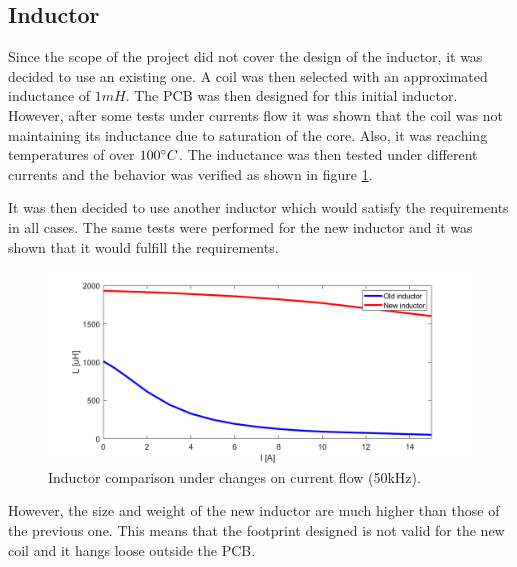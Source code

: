 \subsection{Inductor}
\label{Coil problems}
Since the scope of the project did not cover the design of the inductor, it was decided to use an existing one. A coil was then selected with an approximated inductance of $1mH$.
The PCB was then designed for this initial inductor. However, after some  tests under currents flow it was shown that the coil was not maintaining its inductance due to saturation of the core. Also, it was reaching temperatures of over $100\dec C$. The inductance was then tested under different currents and the behavior was verified as shown in figure \ref{Coil comparison}.

It was then decided to use another inductor which would satisfy the requirements in all cases. The same tests were performed for the new inductor and it was shown that it would fulfill the requirements. 

\begin{figure}[H]
	\begin{center}
		\includegraphics[width=1\textwidth]{docs/discussion/CoilTests/CoilComparison50kHzV2.png}
		\caption{Inductor comparison under changes on current flow (50kHz).}
		\label{Coil comparison}
	\end{center}	
\end{figure}

However, the size and weight of the new inductor are much higher than those of the previous one. This means that the footprint designed is not valid for the new coil and it hangs loose outside the PCB.

